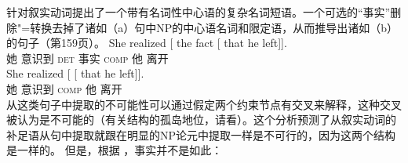 \noindent
 \citet{KK70a}针对叙实动词提出了一个带有名词性中心语的复杂名词短语。一个可选的“事实”删除"=转换去掉了诸如（a）句中NP的中心语名词和限定语，从而推导出诸如（b）的句子（第159页）。
\eal
\ex 
\gll She realized [ the fact [ that he left]].\\
     她   意识到   {}         \textsc{det} 事实 {} \textsc{comp} 他 离开\\
\ex 
\gll She realized [ [ that he left]].\\
她 意识到 {} {} \textsc{comp} 他 离开\\
\zl
从这类句子中提取的不可能性可以通过假定两个约束节点有交叉来解释，这种交叉被认为是不可能的（有关结构的孤岛地位，请看\citealp[\S~4]{KK70a}）。这个分析预测了从叙实动词的补足语从句中提取就跟在明显的NP论元中提取一样是不可行的，因为这两个结构是一样的。
但是，根据 \citet[]{AG2008a}，事实并不是如此：
\eal
{}
\zl

